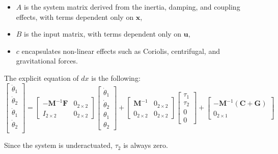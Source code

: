 \begin{itemize}
    \item \(A\) is the system matrix derived from the inertia, damping, and coupling effects, with terms dependent only on $\mathbf{x}$,
    \item \(B\) is the input matrix, with terms dependent only on $\mathbf{u}$,
    \item \(c\) encapsulates non-linear effects such as Coriolis, centrifugal, and gravitational forces.
\end{itemize}

\noindent The explicit equation of $dx$ is the following:
\begin{equation}
\begin{bmatrix}
    \ddot \theta_1 \\
    \ddot \theta_2 \\
    \dot \theta_1 \\
    \dot \theta_2 \\
\end{bmatrix}
=
\begin{bmatrix}
    -\mathbf{M}^{-1} \mathbf{F} & 0_{2 \times 2} \\
    I_{2 \times 2} & 0_{2 \times 2}
\end{bmatrix}
\begin{bmatrix}
    \dot \theta_1 \\
    \dot \theta_2 \\
    \theta_1 \\
    \theta_2
\end{bmatrix}
+
\begin{bmatrix}
    \mathbf{M}^{-1} & 0_{2 \times 2} \\
    0_{2 \times 2} & 0_{2 \times 2}
\end{bmatrix}
\begin{bmatrix}
    \tau_1 \\
    \tau_2 \\
    0 \\
    0
\end{bmatrix}
+
\begin{bmatrix}
    -\mathbf{M}^{-1} (\mathbf{C} + \mathbf{G}) \\
    0_{2 \times 1}
\end{bmatrix}
\label{eq:state-update}
\end{equation}

Since the system is underactuated, $\tau_2$ is always zero.
